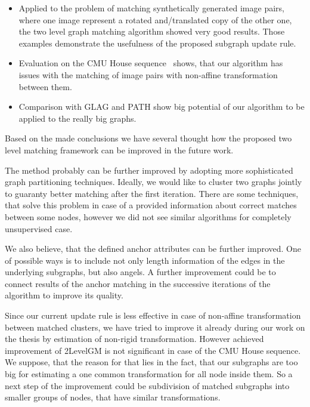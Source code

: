 \begin{itemize}
\item Applied to the problem of matching synthetically generated image pairs, where one image represent a rotated and/translated copy of the other one, the two level graph matching algorithm showed very good results.
Those examples demonstrate the usefulness of the proposed subgraph update rule.
\item Evaluation on the CMU House sequence~\cite{CMUHouse} shows, that our algorithm has issues with the matching of image pairs with non-affine transformation between them.
\item Comparison with GLAG and PATH show big potential of our algorithm to be applied to the really big graphs.
\end{itemize}

Based on the made conclusions we have several thought how the proposed two level matching framework can be improved in the future work. %

The method probably can be further improved by adopting more sophisticated graph partitioning techniques. Ideally, we would like to cluster two graphs jointly to guaranty better matching after the first iteration. There are some techniques, that solve this problem in case of a provided information about correct matches between some nodes, however we did not see similar algorithms for completely unsupervised case.

We also believe, that the defined anchor attributes can be further improved. One of possible ways is to include not only length information of the edges in the underlying subgraphs, but also angels. A further improvement could be to connect results of the anchor matching in the successive iterations of the algorithm to improve its quality.

Since our current update rule is less effective in case of non-affine transformation between matched clusters, we have tried to improve it already during our work on the thesis by estimation of non-rigid transformation. However achieved improvement of 2LevelGM is not significant in case of the CMU House sequence. We suppose, that the reason for that lies in the fact, that our subgraphs are too big for estimating a one common transformation for all node inside them. So a next step of the improvement could be subdivision of matched subgraphs into smaller groups of nodes, that have similar transformations.

